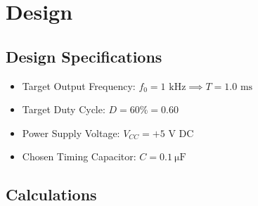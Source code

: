 \section{Design}
\subsection{Design Specifications}
\begin{itemize}
	\item Target Output Frequency: $f_0 = 1\text{ kHz} \implies T = 1.0\text{ ms}$
	\item Target Duty Cycle: $D = 60\% = 0.60$
	\item Power Supply Voltage: $V_{CC} = +5\text{ V DC}$
	\item Chosen Timing Capacitor: $C = \SI{0.1}{\micro\farad}$
\end{itemize}

\subsection{Calculations}
